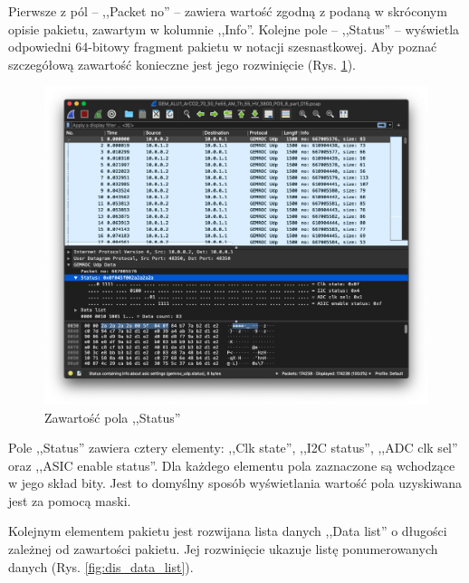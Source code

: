 \documentclass[a4paper, 12pt, twoside, openright]{article}
\begin{document}
Pierwsze z pól -- ,,Packet no'' -- zawiera wartość zgodną z podaną w skróconym opisie pakietu, zawartym w kolumnie ,,Info''. Kolejne pole -- ,,Status'' --
wyświetla odpowiedni 64-bitowy fragment pakietu w notacji szesnastkowej. Aby poznać szczegółową zawartość konieczne jest jego rozwinięcie (Rys. \ref{fig:dis_status}).

	\begin{figure}[H]
		\centering
			\includegraphics[width=1.0\textwidth]{img/screenshot_dissector_status.png}
		\caption{Zawartość pola ,,Status''}
		\label{fig:dis_status}
	\end{figure}

Pole ,,Status'' zawiera cztery elementy: ,,Clk state'', ,,I2C status'', ,,ADC clk sel'' oraz ,,ASIC enable status''. Dla każdego elementu
pola zaznaczone są wchodzące w jego skład bity. Jest to domyślny sposób wyświetlania wartość pola uzyskiwana jest za pomocą maski.

Kolejnym elementem pakietu jest rozwijana lista danych ,,Data list'' o długości zależnej od zawartości pakietu. Jej rozwinięcie ukazuje
listę ponumerowanych danych (Rys. \ref{fig:dis_data_list}).
\end{document}
